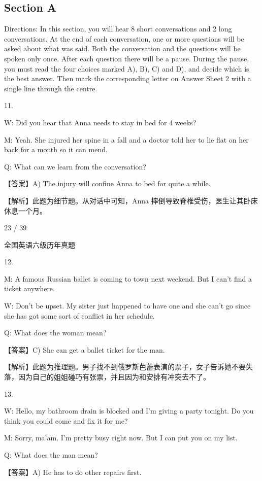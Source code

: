 \documentclass[UTF8,11pt]{ctexart}
\begin{document}
\subsection*{Section A}


Directions: In this section, you will hear 8 short conversations and 2 long conversations. At the end of each conversation, one or more questions will be asked about what was said. Both the conversation and the questions will be spoken only once. After each question there will be a pause. During the pause, you must read the four choices marked A), B), C) and D), and decide which is the best answer. Then mark the corresponding letter on Answer Sheet 2 with a single line through the centre.


11.


W: Did you hear that Anna needs to stay in bed for 4 weeks?


M: Yeah. She injured her spine in a fall and a doctor told her to lie flat on her back for a month so it can mend.


Q: What can we learn from the conversation?


【答案】A) The injury will confine Anna to bed for quite a while.


【解析】此题为细节题。从对话中可知，Anna 摔倒导致脊椎受伤，医生让其卧床休息一个月。


23 / 39


全国英语六级历年真题


12.


M: A famous Russian ballet is coming to town next weekend. But I can’t find a ticket anywhere.


W: Don’t be upset. My sister just happened to have one and she can’t go since she has got some sort of conflict in her schedule.


Q: What does the woman mean?


【答案】C) She can get a ballet ticket for the man.


【解析】此题为推理题。男子找不到俄罗斯芭蕾表演的票子，女子告诉她不要失落，因为自己的姐姐碰巧有张票，并且因为和安排有冲突去不了。


13.


W: Hello, my bathroom drain is blocked and I’m giving a party tonight. Do you think you could come and fix it for me?


M: Sorry, ma’am. I’m pretty busy right now. But I can put you on my list.


Q: What does the man mean?


【答案】A) He has to do other repairs first.
\end{document}

